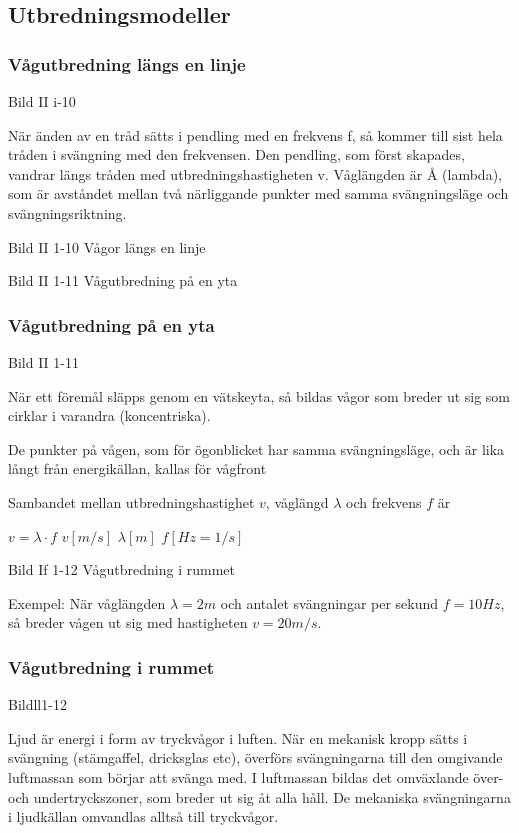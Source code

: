 \subsection{Utbredningsmodeller}

\subsubsection{Vågutbredning längs en linje}

Bild II i-10

När änden av en tråd sätts i pendling med en frekvens f, så kommer till sist hela tråden i
svängning med den frekvensen. Den pendling, som först skapades, vandrar längs tråden med
utbredningshastigheten v. Våglängden är Å (lambda), som är avståndet mellan två
närliggande punkter med samma svängningsläge och svängningsriktning.

Bild II 1-10 Vågor längs en linje

Bild II 1-11 Vågutbredning på en yta

\subsubsection{Vågutbredning på en yta}

Bild II 1-11

När ett föremål släpps genom en vätskeyta, så bildas vågor som breder ut sig som cirklar
i varandra (koncentriska).

De punkter på vågen, som för ögonblicket har samma svängningsläge, och är lika långt från
energikällan, kallas för vågfront

Sambandet mellan utbredningshastighet $v$, våglängd $\lambda$ och frekvens $f$ är

$v = \lambda \cdot f$ $v [m/s]$ $\lambda [m]$ $f [Hz=1/s]$

Bild If 1-12 Vågutbredning i rummet

Exempel: När våglängden $\lambda = 2 m$ och antalet svängningar per sekund $f = 10 Hz$,
så breder vågen ut sig med hastigheten $v = 20 m/s$.

\subsubsection{Vågutbredning i rummet}

Bildll1-12

Ljud är energi i form av tryckvågor i luften. När en mekanisk kropp sätts i svängning
(stämgaffel, dricksglas etc), överförs svängningarna till den omgivande luftmassan som
börjar att svänga med. I luftmassan bildas det omväxlande över- och undertryckszoner, som
breder ut sig åt alla håll. De mekaniska svängningarna i ljudkällan omvandlas alltså till
tryckvågor.

